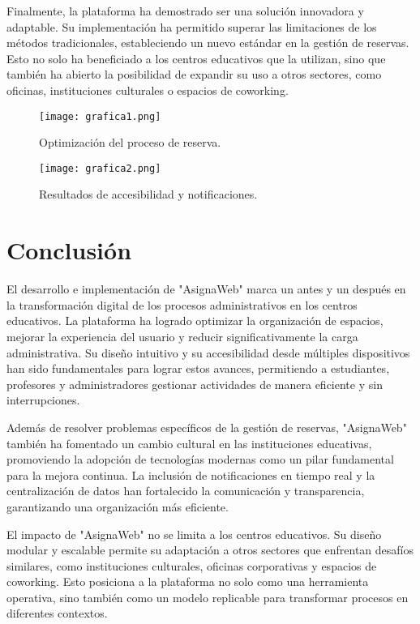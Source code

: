 \documentclass[12pt,a4paper]{article}
\begin{document}
\begin{multicols}{2}
Finalmente, la plataforma ha demostrado ser una solución innovadora y adaptable. Su implementación ha permitido superar las limitaciones de los métodos tradicionales, estableciendo un nuevo estándar en la gestión de reservas. Esto no solo ha beneficiado a los centros educativos que la utilizan, sino que también ha abierto la posibilidad de expandir su uso a otros sectores, como oficinas, instituciones culturales o espacios de coworking.


\begin{figure}[h!]
    \centering
    \texttt{[image: grafica1.png]}
    \caption{Optimización del proceso de reserva.}
    \label{fig:optimización}
\end{figure}

\begin{figure}[h!]
    \centering
    \texttt{[image: grafica2.png]}
    \caption{Resultados de accesibilidad y notificaciones.}
    \label{fig:accesibilidad}
\end{figure}

\section*{Conclusión}
El desarrollo e implementación de "AsignaWeb" marca un antes y un después en la transformación digital de los procesos administrativos en los centros educativos. La plataforma ha logrado optimizar la organización de espacios, mejorar la experiencia del usuario y reducir significativamente la carga administrativa. Su diseño intuitivo y su accesibilidad desde múltiples dispositivos han sido fundamentales para lograr estos avances, permitiendo a estudiantes, profesores y administradores gestionar actividades de manera eficiente y sin interrupciones.

Además de resolver problemas específicos de la gestión de reservas, "AsignaWeb" también ha fomentado un cambio cultural en las instituciones educativas, promoviendo la adopción de tecnologías modernas como un pilar fundamental para la mejora continua. La inclusión de notificaciones en tiempo real y la centralización de datos han fortalecido la comunicación y transparencia, garantizando una organización más eficiente.

El impacto de "AsignaWeb" no se limita a los centros educativos. Su diseño modular y escalable permite su adaptación a otros sectores que enfrentan desafíos similares, como instituciones culturales, oficinas corporativas y espacios de coworking. Esto posiciona a la plataforma no solo como una herramienta operativa, sino también como un modelo replicable para transformar procesos en diferentes contextos.


\end{multicols}
\end{document}
